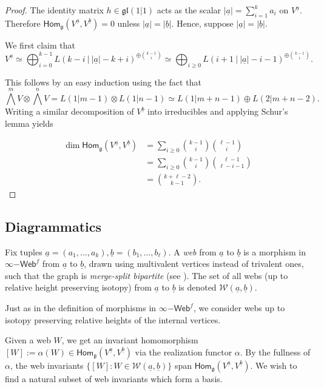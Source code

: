 \documentclass[11pt,a4paper,reqno]{amsart}
\newcommand{\g}{\mathfrak{g}}
\newcommand{\gl}{\mathfrak{gl}}
\renewcommand{\a}{\alpha}
\renewcommand{\b}{\mathfrak{b}}
\numberwithin{equation}{section}
\renewcommand{\hom}{\mathsf{Hom}}
\renewcommand{\a}{\underline a}
\renewcommand{\b}{\underline b}
\newcommand{\W}{\mathcal{W}}
\theoremstyle{definition}
\theoremstyle{remark}
\begin{document}
\begin{proof}
    The identity matrix $h\in \gl(1|1)$ acts as the scalar $|\a| = \sum_{i=1}^k a_i$ on $V^{\a}$. Therefore $\hom_{\g}(V^{\a}, V^{\b}) = 0$ unless $|\a| = |\b|$. Hence, suppose $|\a| = |\b|$.
    
    We first claim that 
    \[V^{\underline a} \simeq \bigoplus_{i=0}^{k-1} L(k-i\ \big\vert\  |\a|-k+i)^{\oplus \binom{k-1}{i}}\simeq \bigoplus_{i\ge0} L(i+1\ \big\vert\ |\a|-i-1)^{\oplus \binom{k-1}{i}}.\]

    This follows by an easy induction using the fact that
    \[\bigwedge^mV\otimes \bigwedge^n V = L(1|m-1)\otimes L(1|n-1)\simeq L(1|m+n-1)\oplus L(2|m+n-2).\]
    Writing a similar decomposition of $V^{\underline b}$ into irreducibles and applying Schur's lemma yields

    \begin{align*}
        \dim\hom_\g(V^{\underline a}, V^{\underline b}) &= \sum_{i\ge0} \binom{k-1}{i}\binom{\ell-1}{i}\\
        &= \sum_{i\ge 0}\binom{k-1}{i}\binom{\ell-1}{\ell-i-1}\\
        &= \binom{k+\ell-2}{k-1}. 
    \end{align*}
\end{proof}

\subsection{Diagrammatics}

Fix tuples $\a = (a_1,\dots, a_k), \b=(b_1, \dots, b_\ell)$. A \emph{web} from $\a$ to $\b$ is a morphism in $\infty{-\mathsf{Web}^f}$ from $\a$ to $\b$, drawn using multivalent vertices instead of trivalent ones, such that the graph is \emph{merge-split bipartite} (see ). The set of all webs (up to relative height preserving isotopy) from $\a$ to $\b$ is denoted $\W(\a,\b)$.

Just as in the definition of morphisms in $\infty\mathsf{-Web}^f$, we consider webs up to isotopy preserving relative heights of the internal vertices.

Given a web $W$, we get an invariant homomorphism $[W] := \alpha(W)\in \hom_\g(V^{\a}, V^{\b})$ via the realization functor $\alpha$. By the fullness of $\alpha$, the web invariants $\{[W]: W\in \W(\a,\b)\}$ span $\hom_\g(V^{\a},V^{\b})$. We wish to find a natural subset of web invariants which form a basis.
\end{document}
